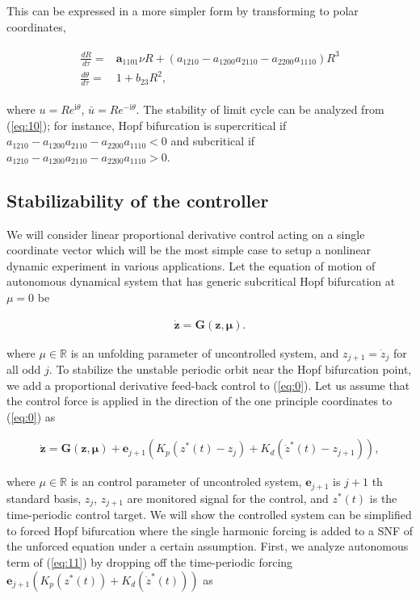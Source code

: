 \documentclass[openacc]{rsproca_new}%
\def\real{\mathbb{R}}
\def\vec#1{\ensuremath{\mathbf{#1}}}
\newcommand{\Eref}[1]{(\ref{#1})}
\begin{document}
\noindent This can be expressed in a more simpler form by transforming to polar coordinates,

\begin{align}\label{eq:10}
\begin{split}
\frac{dR}{d\tau}=&\vec{a}_{1101}\nu R+(a_{1210}-a_{1200}a_{2110}-a_{2200}a_{1110})R^3\\
\frac{d\theta}{d\tau}=&1+b_{23}R^2,
\end{split}
\end{align}

\noindent where $u=Re^{\textrm{i} \theta}$, $\bar u=Re^{-\textrm{i} \theta}$. The stability of limit cycle can be analyzed from \Eref{eq:10}; for instance, Hopf bifurcation is supercritical if \(a_{1210}-a_{1200}a_{2110}-a_{2200}a_{1110}<0\) and subcritical if \(a_{1210}-a_{1200}a_{2110}-a_{2200}a_{1110}>0\).


\subsection{Stabilizability of the controller}

We will consider linear proportional derivative control acting on a single coordinate vector which will be the most simple case to setup a nonlinear dynamic experiment in various applications. Let the equation of motion of autonomous dynamical system that has  generic subcritical Hopf bifurcation at $\mu=0$ be

\begin{align}\label{eq:0}
    \dot{\vec{z}} =\vec{G}(\vec{z},\vec{\mu}).
\end{align}

\noindent where $\mu\in \real$ is an unfolding parameter of uncontrolled system, and $z_{j+1}=\dot z_j$ for all odd $j$. To stabilize the unstable periodic orbit near the Hopf bifurcation point, we add a proportional derivative feed-back control to \Eref{eq:0}. Let us assume that the control force is applied in the direction of the one principle coordinates to \Eref{eq:0} as

\begin{align}\label{eq:11}
    \dot{\vec{z}} =\vec{G}(\vec{z},\vec{\mu})+\vec{e}_{j+1}(K_p(z^*(t)-z_j)+K_d(\dot z^*(t)-z_{j+1})),
\end{align}

\noindent where $\mu\in \real$ is an control parameter of uncontroled system, $\vec{e}_{j+1}$ is $j+1$ th standard basis, $z_{j}$, $z_{j+1}$ are monitored signal for the control, and $z^*(t)$  is the time-periodic control target. We will show the controlled system can be simplified to forced Hopf bifurcation where the single harmonic forcing is added to a SNF of the unforced equation under a certain assumption. First, we analyze autonomous term of \Eref{eq:11} by dropping off the time-periodic forcing $\vec{e}_{j+1}(K_p(z^*(t))+K_d(\dot z^*(t)))$ as
\end{document}
